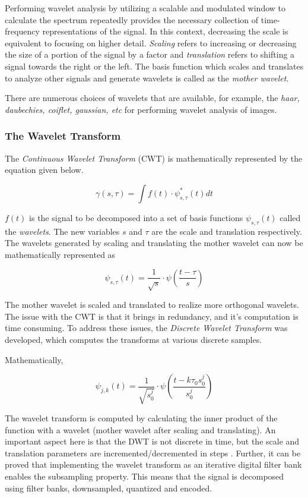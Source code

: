 \documentclass[./A14_Report.tex]{subfiles}
\begin{document}
\par

Performing wavelet analysis by utilizing a scalable and modulated window to
calculate the spectrum repeatedly provides the necessary collection of
time-frequency representations of the signal. In this context, decreasing the
scale is equivalent to focusing on higher detail. \textit{Scaling} refers to
increasing or decreasing the size of a portion of the signal by a factor and
\textit{translation} refers to shifting a signal towards the right or the left.
The basis function which scales and translates to analyze other signals and
generate wavelets is called as the \textit{mother wavelet}.

\par

There are numerous choices of wavelets that are available, for example, the
\textit{haar, daubechies, coiflet, gaussian, etc} for performing wavelet
analysis of images.

\subsubsection{The Wavelet Transform}%
\label{sec:the_wavelet_transform}

The \textit{Continuous Wavelet Transform} (CWT) is mathematically represented
by the equation given below.

\[\gamma(s, \tau) = \int f(t)\cdot\psi^{*}_{s, \tau}(t)dt\]

\(f(t)\) is the signal to be decomposed into a set of basis functions
\(\psi_{s,\tau}(t)\) called the \textit{wavelets}. The new variables \(s\) and
$\tau$ are the scale and translation respectively. The wavelets generated by
scaling and translating the mother wavelet can now be mathematically
represented as

$$\psi_{s,\tau}(t)=\frac{1}{\sqrt{s}}\cdot\psi \left (\frac{t-\tau}{s} \right)$$

The mother wavelet is scaled and translated to realize more orthogonal
wavelets.  The issue with the CWT is that it brings in redundancy, and it's
computation is time consuming.  To address these issues, the \textit{Discrete
Wavelet Transform} was developed, which computes the transforms at various
discrete samples.

Mathematically,

$$\psi_{j,k}(t) = \frac{1}{\sqrt{s_{0}^j}} \cdot \psi \left (\frac{t - k \tau_{0}s_{0}^j}{s_{0}^j} \right )$$

The wavelet transform is computed by calculating the inner product of the
function with a wavelet (mother wavelet after scaling and translating).  An
important aspect here is that the DWT is not discrete in time, but the scale
and translation parameters are incremented/decremented in steps
\cite{valwav1999}.  Further, it can be proved that implementing the wavelet
transform as an iterative digital filter bank enables the subsampling property.
This means that the signal is decomposed using filter banks, downsampled,
quantized and encoded.
\end{document}
